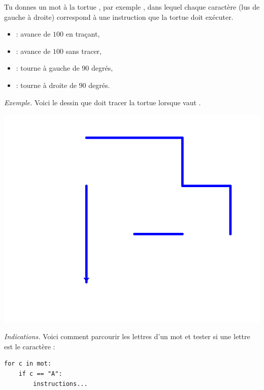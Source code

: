 \documentclass[11pt,class=report,crop=false]{standalone}
\begin{document}
\begin{activite}


Tu donnes un mot à la tortue \Python, par exemple , dans lequel chaque caractère (lus de gauche à droite) correspond à une instruction que la tortue doit exécuter.

\begin{itemize}
  \item {} : avance de $100$ en traçant,
  \item {} : avance de $100$ sans tracer,  
  \item {} : tourne à gauche de $90$ degrés,
  \item {} : tourne à droite de $90$ degrés.
\end{itemize}

\emph{Exemple.}
Voici le dessin que doit tracer la tortue lorsque  vaut . 

\begin{center}
\includegraphics[scale=\myscale,scale=0.4]{ecran-sialors-2}
\end{center}

\emph{Indications.}
Voici comment parcourir les lettres d'un mot et tester si une lettre est le caractère  :
\begin{center}
\begin{minipage}{0.5\textwidth}
\begin{lstlisting}
for c in mot:
    if c == "A":
        instructions...
\end{lstlisting}
\end{minipage} 
\end{center} 

   
\end{activite}
\end{document}
